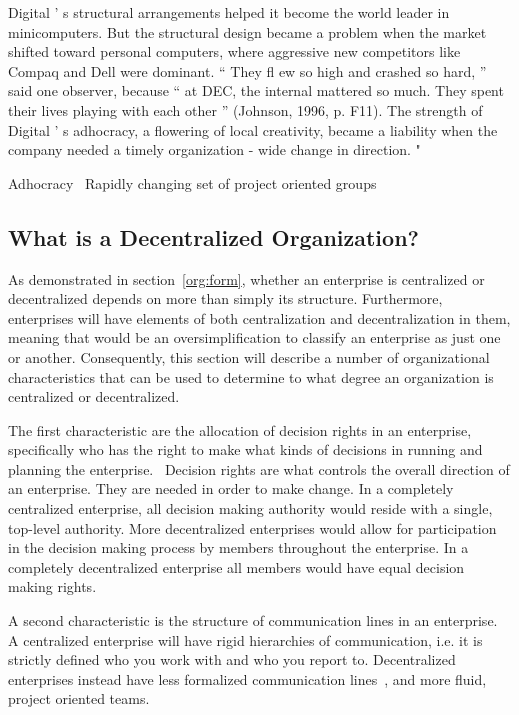 Digital ’ s structural arrangements helped it become the world leader in minicomputers. But the structural design became a problem when the market shifted toward personal computers, where aggressive new competitors like Compaq and Dell were dominant. “ They fl ew so high and crashed so hard, ” said one observer, because “ at DEC, the internal mattered so much. They spent their lives playing with each other ” (Johnson, 1996, p. F11). The strength of Digital ’ s adhocracy, a flowering of local creativity, became a liability when the company needed a timely organization - wide change in direction.
"

Adhocracy~\cite{Applegate1988a}
Rapidly changing set of project oriented groups

\subsection{What is a Decentralized Organization?}

As demonstrated in section~\ref{org:form}, whether an enterprise is centralized or decentralized depends on more than simply its structure. Furthermore, enterprises will have elements of both centralization and decentralization in them, meaning that would be an oversimplification to classify an enterprise as just one or another. Consequently, this section will describe a number of organizational characteristics that can be used to determine to what degree an organization is centralized or decentralized. 

The first characteristic are the allocation of decision rights in an enterprise, specifically who has the right to make what kinds of decisions in running and planning the enterprise.~\cite{pearlson2009} Decision rights are what controls the overall direction of an enterprise. They are needed in order to make change. In a completely centralized enterprise, all decision making authority would reside with a single, top-level authority. More decentralized enterprises would allow for participation in the decision making process by members throughout the enterprise. In a completely decentralized enterprise all members would have equal decision making rights. 

A second characteristic is the structure of communication lines in an enterprise. A centralized enterprise will have rigid hierarchies of communication, i.e. it is strictly defined who you work with and who you report to. Decentralized enterprises instead have less formalized communication lines~\cite{pearlson2009}, and more fluid, project oriented teams.~\cite{Applegate1988a}

